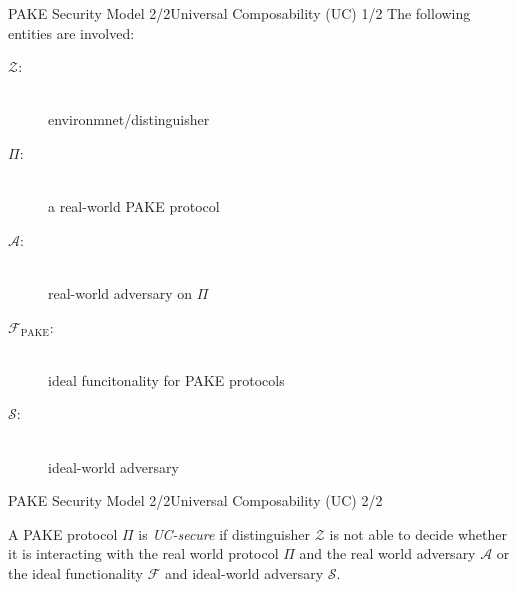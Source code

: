 \documentclass[notes,xcolor=dvipsnames]{beamer}
\begin{document}
\begin{frame}{PAKE Security Model 2/2}{Universal Composability (UC) 1/2}
The following entities are involved:
\begin{description}
    \item[$\mathcal{Z}$:] \hfill \\ environmnet/distinguisher
    \item[$\Pi$:] \hfill \\ a real-world PAKE protocol
    \item[$\mathcal{A}$:] \hfill \\ real-world adversary on $\Pi$
    \item[$\mathcal{F}_{\text{PAKE}}$:] \hfill \\ ideal funcitonality for PAKE protocols
    \item[$\mathcal{S}$:] \hfill \\ ideal-world adversary
\end{description}
\end{frame}

\begin{frame}{PAKE Security Model 2/2}{Universal Composability (UC) 2/2}
\begin{definition}[UC-Security]\label{def:uc}
A PAKE protocol $\Pi$ is \emph{UC-secure} if distinguisher $\mathcal{Z}$ is not able to decide whether it is interacting with the real world protocol $\Pi$ and the real world adversary $\mathcal{A}$ or the ideal functionality $\mathcal{F}$ and ideal-world adversary $\mathcal{S}$.
\end{definition}

\end{frame}
\end{document}
